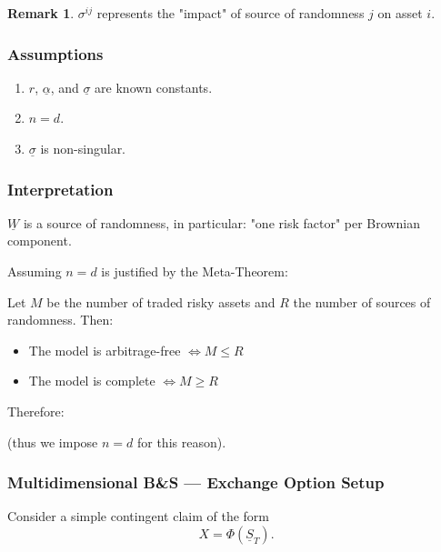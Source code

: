 \documentclass[12pt,a4paper]{article}
\theoremstyle{definition}
\newtheorem{remark}{Remark}[section]
\begin{document}
\begin{remark}
$\sigma^{ij}$ represents the "impact" of source of randomness $j$ on asset $i$.
\end{remark}

\subsubsection{Assumptions}

\begin{enumerate}
\item $r$, $\underline{\alpha}$, and $\underline{\sigma}$ are known constants.
\item $n = d$.
\item $\underline{\sigma}$ is non-singular.
\end{enumerate}

\subsubsection{Interpretation}

$\underline{W}$ is a source of randomness, in particular: "one risk factor" per Brownian component.

Assuming $n = d$ is justified by the Meta-Theorem:

Let $M$ be the number of traded risky assets and $R$ the number of sources of randomness. Then:
\begin{itemize}
\item The model is arbitrage-free $\Longleftrightarrow M \leq R$
\item The model is complete $\Longleftrightarrow M \geq R$
\end{itemize}

Therefore:

\begin{center}
\end{center}

(thus we impose $n = d$ for this reason).

\subsubsection{Multidimensional B\&S — Exchange Option Setup}

Consider a simple contingent claim of the form
\[
X = \Phi(\underline{S}_T).
\]
\end{document}
